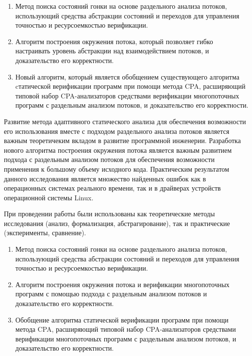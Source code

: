 {\novelty}
\begin{enumerate}
  \item Метод поиска состояний гонки на основе раздельного анализа потоков, использующий средства абстракции состояний и переходов для управления точностью и ресурсоемкостью верификации.
  \item Алгоритм построения окружения потока, который позволяет гибко настраивать уровень абстракции над взаимодействием потоков, и доказательство его корректности.
  \item Новый алгоритм, который является обобщением существующего алгоритма cтатической верификации программ при помощи метода CPA, расширяющий типовой набор CPA-анализаторов средствами верификации многопоточных программ с раздельным анализом потоков, и доказательство его корректности.
\end{enumerate}

{\influence} Развитие метода адаптивного статического анализа для обеспечения возможности его использования вместе с подходом раздельного анализа потоков является важным теоретичеким вкладом в развитие программной инженерии.
Разработка нового алгоритма построения окружения потока является важным развитием подхода с раздельным анализом потоков для обеспечения возможности применения к большому объему исходного кода.
Практическим результатом данного исследования является множество найденных ошибок как в операционных системах реального времени, так и в драйверах устройств операционной системы Linux.

{\methods} При проведении работы были использованы как теоретические методы исследования (анализ, формализация, абстрагирование), так и практические (эксперименты, сравнение).

{}
\begin{enumerate}
\item Метод поиска состояний гонки на основе раздельного анализа потоков, использующий средства абстракции состояний и переходов для управления точностью и ресурсоемкостью верификации. 
\item Алгоритм построения окружения потока и верификации многопоточных программ с помощью подхода с раздельным анализом потоков и доказательство его корректности.
\item Обобщение алгоритма статической верификации программ при помощи
метода CPA, расширяющий типовой набор CPA-анализаторов средствами верификации многопоточных программ с раздельным анализом потоков, и доказательство его корректности.
\end{enumerate}

